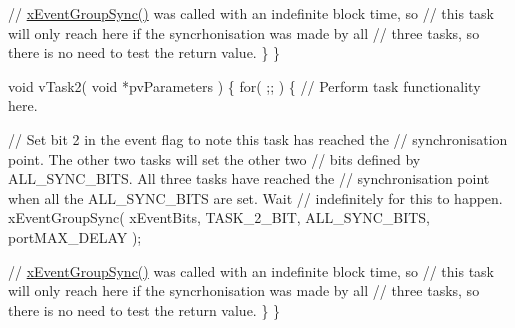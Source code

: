 \begin{DoxyPre}    // \hyperlink{externals_2freertos_2include_2event__groups_8h_a869511456b86426f52e2eec898bff341}{xEventGroupSync()} was called with an indefinite block time, so
    // this task will only reach here if the syncrhonisation was made by all
    // three tasks, so there is no need to test the return value.
    \}
\}\end{DoxyPre}



\begin{DoxyPre}void vTask2( void *pvParameters )
\{
    for( ;; )
    \{
    // Perform task functionality here.\end{DoxyPre}



\begin{DoxyPre}    // Set bit 2 in the event flag to note this task has reached the
    // synchronisation point.  The other two tasks will set the other two
    // bits defined by ALL\_SYNC\_BITS.  All three tasks have reached the
    // synchronisation point when all the ALL\_SYNC\_BITS are set.  Wait
    // indefinitely for this to happen.
    xEventGroupSync( xEventBits, TASK\_2\_BIT, ALL\_SYNC\_BITS, portMAX\_DELAY );\end{DoxyPre}



\begin{DoxyPre}    // \hyperlink{externals_2freertos_2include_2event__groups_8h_a869511456b86426f52e2eec898bff341}{xEventGroupSync()} was called with an indefinite block time, so
    // this task will only reach here if the syncrhonisation was made by all
    // three tasks, so there is no need to test the return value.
   \}
\}\end{DoxyPre}



\begin{DoxyPre}\end{DoxyPre}
 